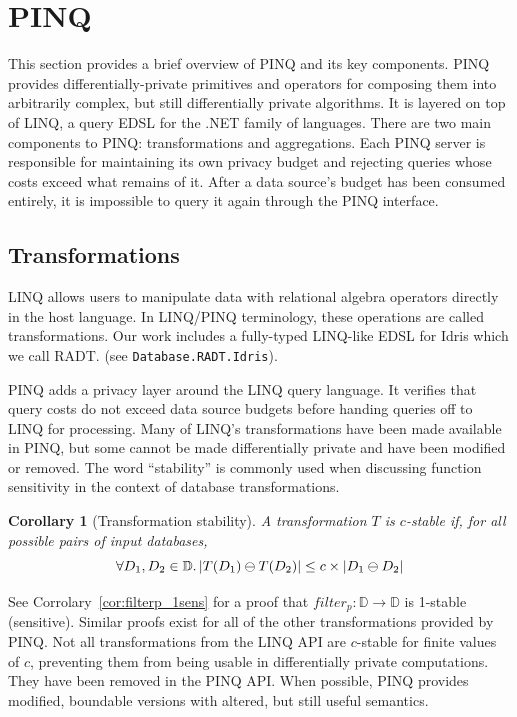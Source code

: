 \documentclass[12pt]{report}
\newtheorem{cor}[defn]{Corollary}
\begin{document}
\section{PINQ}\label{sec:pinq}

This section provides a brief overview of PINQ and its key components.
PINQ provides differentially-private primitives and operators for composing them into arbitrarily complex, but still differentially private algorithms.
It is layered on top of LINQ, a query EDSL for the .NET family of languages.
There are two main components to PINQ: transformations and aggregations.
Each PINQ server is responsible for maintaining its own privacy budget and rejecting queries whose costs exceed what remains of it.
After a data source's budget has been consumed entirely, it is impossible to query it again through the PINQ interface.

\subsection{Transformations}

LINQ allows users to manipulate data with relational algebra operators directly in the host language.
In LINQ/PINQ terminology, these operations are called transformations.
Our work includes a fully-typed LINQ-like EDSL for Idris which we call RADT. (see \texttt{Database.RADT.Idris}).

PINQ adds a privacy layer around the LINQ query language.
It verifies that query costs do not exceed data source budgets before handing queries off to LINQ for processing.
Many of LINQ's transformations have been made available in PINQ, but some cannot be made differentially private and have been modified or removed.
The word ``stability'' is commonly used when discussing function sensitivity in the context of database transformations.

\begin{cor}[Transformation stability]
A transformation $T$ is $c$-stable if, for all possible pairs of input databases,
$$
  \forall D_1,D_2\in\mathbb D\ldotp |T(D_1)\ominus T(D_2)| \le c \times | D_1 \ominus D_2 |
$$
\end{cor}

See Corrolary~\ref{cor:filterp_1sens} for a proof that $filter_p : \mathbb D \rightarrow \mathbb D$ is 1-stable (sensitive).
Similar proofs exist for all of the other transformations provided by PINQ\cite{conf/sigmod/McSherry09}.
Not all transformations from the LINQ API are $c$-stable for finite values of $c$, preventing them from being usable in differentially private computations.
They have been removed in the PINQ API.
When possible, PINQ provides modified, boundable versions with altered, but still useful semantics.
\end{document}
